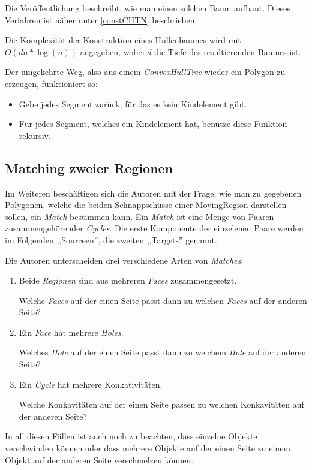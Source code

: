 Die Veröffentlichung beschreibt, wie man einen solchen Baum aufbaut. Dieses Verfahren ist näher unter \vref{constCHTN} beschrieben.

Die Komplexität der Konstruktion eines Hüllenbaumes wird mit $O(dn*\log(n))$ angegeben, wobei $d$ die Tiefe des resultierenden Baumes ist.

Der umgekehrte Weg, also aus einem \textit{ConvexHullTree} wieder ein Polygon zu erzeugen, funktioniert so:

\begin{itemize}
\item Gebe jedes Segment zurück, für das es kein Kindelement gibt.
\item Für jedes Segment, welches ein Kindelement hat, benutze diese Funktion rekursiv.
\end{itemize}

\subsection{Matching zweier Regionen}

Im Weiteren beschäftigen sich die Autoren mit der Frage, wie man zu gegebenen Polygonen, welche die beiden Schnappschüsse einer MovingRegion darstellen sollen, ein \textit{Match} bestimmen kann. Ein \textit{Match} ist eine Menge von Paaren zusammengehörender \textit{Cycles}. Die erste Komponente der einzelenen Paare werden im Folgenden ,,Sourceen'', die zweiten ,,Targets'' genannt.

Die Autoren unterscheiden drei verschiedene Arten von \textit{Matches}:

\begin{enumerate}
\item Beide \textit{Regionen} sind aus mehreren \textit{Faces} zusammengesetzt.
 
Welche \textit{Faces} auf der einen Seite passt dann zu welchen \textit{Faces} auf der anderen Seite?
\item Ein \textit{Face} hat mehrere \textit{Holes}.
 
Welches \textit{Hole} auf der einen Seite passt dann zu welchem \textit{Hole} auf der anderen Seite?
\item Ein \textit{Cycle} hat mehrere Konkativitäten.
 
Welche Konkavitäten auf der einen Seite passen zu welchen Konkavitäten auf der anderen Seite?
\end{enumerate}

In all diesen Fällen ist auch noch zu beachten, dass einzelne Objekte verschwinden können oder dass mehrere Objekte auf der einen Seite zu einem Objekt auf der anderen Seite verschmelzen können.

